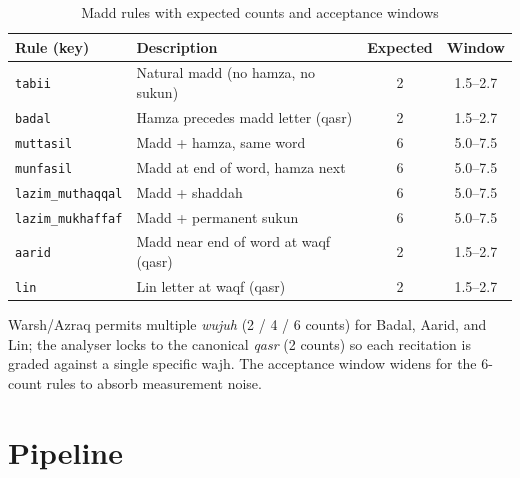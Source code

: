 \begin{table}[H]
  \centering
  \caption{Madd rules with expected counts and acceptance windows}
  \label{tab:madd_rules}
  \renewcommand{\arraystretch}{1.3}
  \begin{tabular}{llcc}
    \toprule
    \textbf{Rule (key)} & \textbf{Description} & \textbf{Expected} & \textbf{Window} \\
    \midrule
    \texttt{tabii}           & Natural madd (no hamza, no sukun)  & 2 & 1.5--2.7 \\
    \texttt{badal}           & Hamza precedes madd letter (qasr)  & 2 & 1.5--2.7 \\
    \texttt{muttasil}        & Madd + hamza, same word            & 6 & 5.0--7.5 \\
    \texttt{munfasil}        & Madd at end of word, hamza next    & 6 & 5.0--7.5 \\
    \texttt{lazim\_muthaqqal}& Madd + shaddah                     & 6 & 5.0--7.5 \\
    \texttt{lazim\_mukhaffaf}& Madd + permanent sukun             & 6 & 5.0--7.5 \\
    \texttt{aarid}           & Madd near end of word at waqf (qasr) & 2 & 1.5--2.7 \\
    \texttt{lin}             & Lin letter at waqf (qasr)          & 2 & 1.5--2.7 \\
    \bottomrule
  \end{tabular}
\end{table}

Warsh/Azraq permits multiple \emph{wujuh} (2 / 4 / 6 counts) for Badal, Aarid, and Lin; the analyser locks to the canonical \emph{qasr} (2 counts) so each recitation is graded against a single specific wajh. The acceptance window widens for the 6-count rules to absorb measurement noise.

\section{Pipeline}



